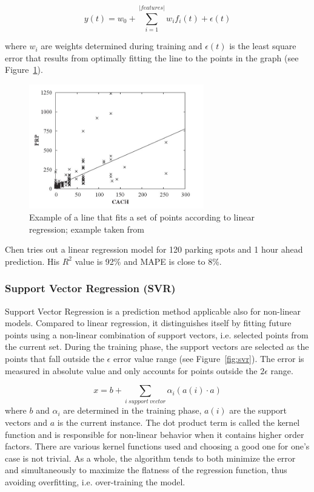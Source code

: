 \documentclass{article}
\begin{document}
$$y(t) = w_0 + \sum_{i=1}^{|features|}w_i f_i(t) + \epsilon(t)$$

where $w_i$ are weights determined during training and $\epsilon(t)$ is the least square error that results from optimally fitting the line to the points in the graph (see Figure~\ref{fig:linear-regression}).

\begin{figure}[!ht]
    \centering
    \includegraphics[width=3.0in]{linear-regression}
    \caption{Example of a line that fits a set of points according to linear regression; example taken from \cite{Witten} }
    \label{fig:linear-regression}
\end{figure}


\vspace{2mm}
Chen\cite{Chen} tries out a linear regression model for 120 parking spots and 1 hour ahead prediction. His $R^2$ value is 92\% and MAPE is close to 8\%.

\subsubsection{Support Vector Regression (SVR)}
Support Vector Regression is a prediction method applicable also for non-linear models. Compared to linear regression, it distinguishes itself by fitting future points using a non-linear combination of support vectors, i.e. selected points from the current set. During the training phase, the support vectors are selected as the points that fall outside the $\epsilon$ error value range (see Figure~\ref{fig:svr}). The error is measured in absolute value and only accounts for points outside the $2\epsilon$ range. 

$$x = b + \sum_{i\:support\:vector} \alpha_i (a(i) \cdot a)  $$
where $b$ and $\alpha_i$ are determined in the training phase, $a(i)$ are the support vectors and $a$ is the current instance.  The dot product term is called the kernel function and is responsible for non-linear behavior when it contains higher order factors. There are various kernel functions used and choosing a good one for one's case is not trivial. As a whole, the algorithm tends to both minimize the error and simultaneously to maximize the flatness of the regression function, thus avoiding overfitting, i.e. over-training the model. 
\end{document}
